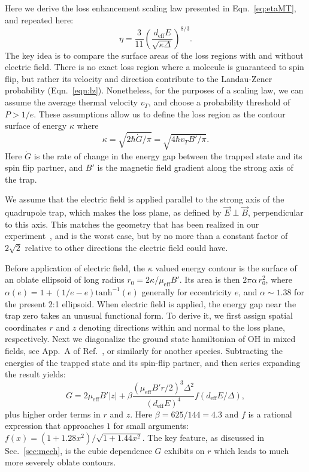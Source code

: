 \documentclass[%
 reprint,
 amsmath,amssymb,
 aps,
pra,
]{revtex4-1}
\begin{document}
Here we derive the loss enhancement scaling law presented in Eqn.~\ref{eq:etaMT}, and repeated here:
\begin{equation}
\eta=\frac{3}{11} \left(\frac{d_\text{eff}E}{\sqrt{\kappa\Delta}}\right)^{8/3}.
\end{equation}
The key idea is to compare the surface areas of the loss regions with and without electric field.
There is no exact loss region where a molecule is guaranteed to spin flip, but rather its velocity and direction contribute to the Landau-Zener probability (Eqn.~\ref{eqn:lz}).
Nonetheless, for the purposes of a scaling law, we can assume the average thermal velocity $v_T$, and choose a probability threshold of $P>1/e$.
These assumptions allow us to define the loss region as the contour surface of energy $\kappa$ where
\begin{equation}
\kappa=\sqrt{2\hbar\dot{G}/\pi}=\sqrt{4\hbar v_T B'/\pi}.
\end{equation}
Here $\dot{G}$ is the rate of change in the energy gap between the trapped state and its spin flip partner, and $B'$ is the magnetic field gradient along the strong axis of the trap.

We assume that the electric field is applied parallel to the strong axis of the quadrupole trap, which makes the loss plane, as defined by $\vec{E}\perp\vec{B}$, perpendicular to this axis. This matches the geometry that has been realized in our experiment~\cite{Stuhl2013}, and is the worst case, but by no more than a constant factor of $2\sqrt{2}$ relative to other directions the electric field could have.

Before application of electric field, the $\kappa$ valued energy contour is the surface of an oblate ellipsoid of long radius $r_0=2\kappa/\mu_\text{eff}B'$.
Its area is then $2\pi\alpha\,r_0^2$, where $\alpha(e)=1+(1/e-e)\text{tanh}^{-1}(e)$ generally for eccentricity $e$, and $\alpha\sim 1.38$ for the present 2:1 ellipsoid.
When electric field is applied, the energy gap near the trap zero takes an unusual functional form.
To derive it, we first assign spatial coordinates $r$ and $z$ denoting directions within and normal to the loss plane, respectively.
Next we diagonalize the ground state hamiltonian of OH in mixed fields, see App.~A of Ref.~\cite{Stuhl2012uwave}, or similarly for another species.
Subtracting the energies of the trapped state and its spin-flip partner, and then series expanding the result yields:
\begin{equation}
\label{eqn:energy}
G = 2\mu_\text{eff}B'|z| + \beta\frac{(\mu_\text{eff}B'r/2)^3\Delta^2}{(d_\text{eff}E)^4}f(d_\text{eff}E/\Delta),
\end{equation}
plus higher order terms in $r$ and $z$.
Here $\beta=625/144=4.3$ and $f$ is a rational expression that approaches $1$ for small arguments: $f(x) = (1 + 1.28x^2)/\sqrt{1+1.44x^2}$.
The key feature, as discussed in Sec.~\ref{sec:mech}, is the cubic dependence $G$ exhibits on $r$ which leads to much more severely oblate contours.
\end{document}
